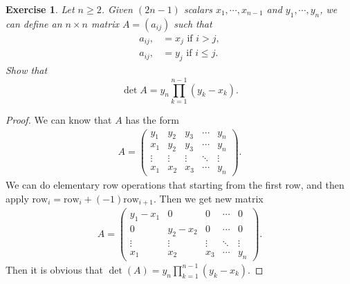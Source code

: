 \documentclass[11pt]{book}
\newtheorem{exercise}{Exercise}[section]
\theoremstyle{definition}
\numberwithin{equation}{chapter}
\begin{document}
\medskip

\begin{exercise}
Let $n\geq2$. Given $\left(  2n-1\right)  $ scalars $x_{1}%
,\cdots,x_{n-1}$ and $y_{1},\cdots,y_{n}$, we can define an $n\times n$ matrix
$A=\left(  a_{ij}\right)  $ such that%
\begin{align*}
    a_{ij}, &  =x_{j}\text{ if }i>j,\\
    a_{ij}, &  =y_{j}\text{ if }i\leq j.
\end{align*}
Show that%
$$
\det A=y_{n}%
{\displaystyle\prod\limits_{k=1}^{n-1}}
\left(  y_{k}-x_{k}\right).
$$
\end{exercise}
\begin{proof}
We can know that $A$ has the form 
\begin{align*}
    A = \begin{pmatrix}
    y_1 & y_2 & y_3 & \cdots & y_n \\
    x_1 & y_2 & y_3 & \cdots & y_n \\
    \vdots & \vdots & \vdots & \ddots & \vdots \\
    x_1 & x_2 & x_3 & \cdots & y_n
    \end{pmatrix}.
\end{align*}
We can do elementary row operations that starting from the first row, and then apply $\text{row}_i=\text{row}_i+(-1)\text{row}_{i+1}$. Then we get new matrix
\begin{align*}
    A = \begin{pmatrix}
    y_1-x_1 & 0 & 0 & \cdots & 0 \\
    0 & y_2-x_2 & 0 & \cdots & 0 \\
    \vdots & \vdots & \vdots & \ddots & \vdots \\
    x_1 & x_2 & x_3 & \cdots & y_n
    \end{pmatrix}.
\end{align*}
Then it is obvious that $\det(A)=y_n \prod_{k=1}^{n-1} (y_k-x_k)$.
\end{proof}

\medskip
\end{document}
